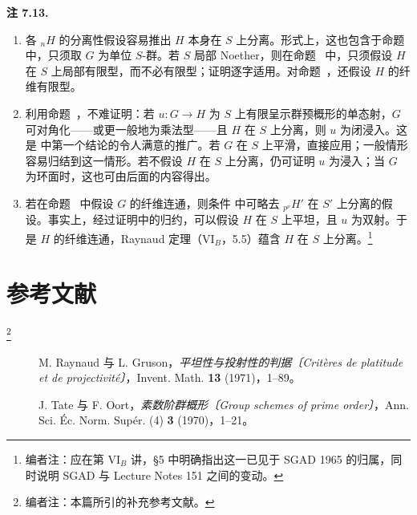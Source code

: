 \medskip
\noindent{}\textbf{注 7.13.}
\begin{enumerate}
  \item[(a)] 各 \({}_nH\) 的分离性假设容易推出 \(H\) 本身在 \(S\) 上分离。形式上，这也包含于命题~ 中，只须取 \(G\) 为单位 \(S\)-群。若 \(S\) 局部 Noether，则在命题~ 中，只须假设 \(H\) 在 \(S\) 上局部有限型，而不必有限型；证明逐字适用。对命题~，还假设 \(H\) 的纤维有限型。

  \item[(b)] 利用命题~，不难证明：若 \(u:G\to H\) 为 \(S\) 上有限呈示群预概形的单态射，\(G\) 可对角化——或更一般地为乘法型——且 \(H\) 在 \(S\) 上分离，则 \(u\) 为闭浸入。这是  中第一个结论的令人满意的推广。若 \(G\) 在 \(S\) 上平滑，直接应用；一般情形容易归结到这一情形。若不假设 \(H\) 在 \(S\) 上分离，仍可证明 \(u\) 为浸入；当 \(G\) 为环面时，这也可由后面的内容得出。

  \item[(c)] 若在命题~ 中假设 \(G\) 的纤维连通，则条件  中可略去 \({}_{p^\nu}H'\) 在 \(S'\) 上分离的假设。事实上，经过证明中的归约，可以假设 \(H\) 在 \(S\) 上平坦，且 \(u\) 为双射。于是 \(H\) 的纤维连通，Raynaud 定理（VI\(_B\)，5.5）蕴含 \(H\) 在 \(S\) 上分离。\footnote{编者注：应在第 VI\(_B\) 讲，§5 中明确指出这一已见于 SGAD 1965 的归属，同时说明 SGAD 与 Lecture Notes 151 之间的变动。}
\end{enumerate}

\section*{参考文献}
\footnote{编者注：本篇所引的补充参考文献。}

\begin{description}
  \item[]
  M. Raynaud 与 L. Gruson，\textit{平坦性与投射性的判据〔Crit\`eres de platitude et de projectivit\'e〕}，Invent. Math. \textbf{13} (1971)，1--89。

  \item[]
  J. Tate 与 F. Oort，\textit{素数阶群概形〔Group schemes of prime order〕}，Ann. Sci. \'Ec. Norm. Sup\'er. (4) \textbf{3} (1970)，1--21。
\end{description}

